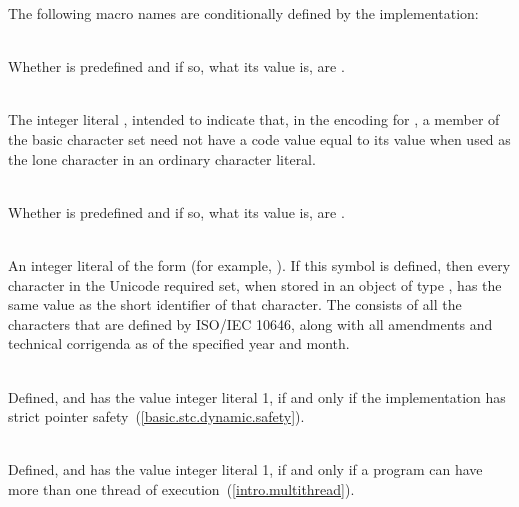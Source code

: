 \pnum
The following macro names are conditionally defined by the implementation:

\begin{description}
\item {}\\
Whether  is predefined and if so, what its value is,
are .

%
%
\item {}\\
The integer literal , intended to indicate that, in the encoding for
, a member of the basic character set need not have a code value equal to
its value when used as the lone character in an ordinary character literal.

%
%
\item {}\\
Whether  is predefined and if so, what its value is,
are .

%
%
\item {}\\
An integer literal of the form  (for example,
).
If this symbol is defined, then every character in the Unicode required set, when
stored in an object of type , has the same value as the short identifier
of that character. The  consists of all
the characters that are defined by ISO/IEC 10646, along with
all amendments and technical corrigenda as of the specified year and month.

%
%
\item {}\\
Defined, and has the value integer literal 1, if and only if the implementation
has strict pointer safety~(\ref{basic.stc.dynamic.safety}).

%
%
\item {}\\
Defined, and has the value integer literal 1, if and only if a program
can have more than one thread of execution~(\ref{intro.multithread}).

\end{description}

